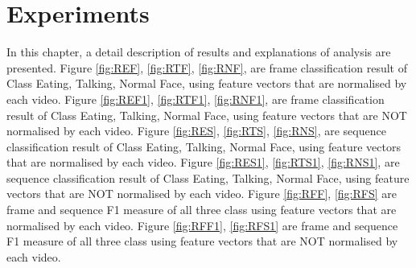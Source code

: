 \section{Experiments}
In this chapter, a detail description of results and explanations of analysis are presented. Figure \ref{fig:REF}, \ref{fig:RTF}, \ref{fig:RNF}, are frame classification result of Class Eating, Talking, Normal Face, using feature vectors that are normalised by each video. Figure \ref{fig:REF1}, \ref{fig:RTF1}, \ref{fig:RNF1}, are frame classification result of Class Eating, Talking, Normal Face, using feature vectors that are NOT normalised by each video. Figure \ref{fig:RES}, \ref{fig:RTS}, \ref{fig:RNS}, are sequence classification result of Class Eating, Talking, Normal Face, using feature vectors that are normalised by each video. Figure \ref{fig:RES1}, \ref{fig:RTS1}, \ref{fig:RNS1}, are sequence classification result of Class Eating, Talking, Normal Face, using feature vectors that are NOT normalised by each video. Figure \ref{fig:RFF}, \ref{fig:RFS} are frame and sequence F1 measure of all three class using feature vectors that are normalised by each video. Figure \ref{fig:RFF1}, \ref{fig:RFS1} are frame and sequence F1 measure of all three class using feature vectors that are NOT normalised by each video.


